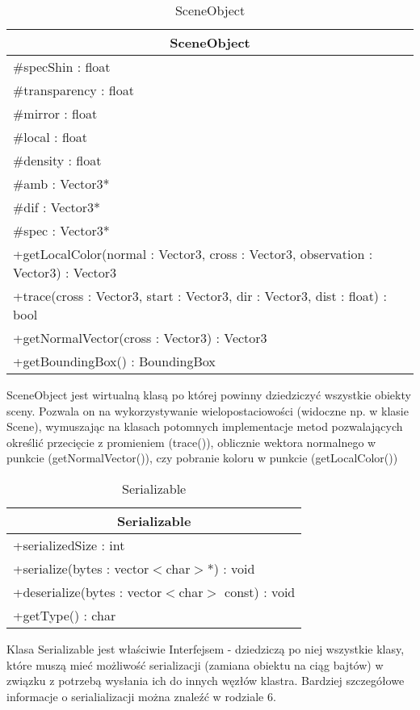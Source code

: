 \begin{longtable}{|p{16cm}|}
    \caption{SceneObject} \label{tab:SceneObject} \\ \hline
    \multicolumn{1}{|c|}{SceneObject} \\ \hline
    \#specShin : float \\
    \#transparency : float \\
    \#mirror : float \\
    \#local : float \\
    \#density : float \\
    \#amb : Vector3* \\
    \#dif : Vector3* \\
    \#spec : Vector3* \\
    \hline
	+getLocalColor(normal : Vector3, cross : Vector3, observation : Vector3) : Vector3 \\
	+trace(cross : Vector3, start : Vector3, dir : Vector3, dist : float) : bool \\
	+getNormalVector(cross : Vector3) : Vector3 \\
	+getBoundingBox() : BoundingBox \\
	\hline
\end{longtable}

SceneObject jest wirtualną klasą po której powinny dziedziczyć wszystkie obiekty sceny. Pozwala on na wykorzystywanie wielopostaciowości (widoczne np. w klasie Scene), wymuszając na klasach potomnych implementacje metod pozwalających określić przecięcie z promieniem (trace()), oblicznie wektora normalnego w punkcie (getNormalVector()), czy pobranie koloru w punkcie (getLocalColor())

\begin{longtable}{|p{16cm}|}
    \caption{Serializable} \label{tab:Serializable} \\ \hline
    \multicolumn{1}{|c|}{Serializable} \\ \hline
    +serializedSize : int \\ \hline
	+serialize(bytes : vector$<$char$>$*) : void \\ 
	+deserialize(bytes : vector$<$char$>$ const) : void \\
	+getType() : char \\
	\hline
\end{longtable}

Klasa Serializable jest właściwie Interfejsem - dziedziczą po niej wszystkie klasy, które muszą mieć możliwość serializacji (zamiana obiektu na ciąg bajtów) w związku z potrzebą wysłania ich do innych węzłów klastra. Bardziej szczegółowe informacje o serialializacji można znaleźć w rodziale 6.

